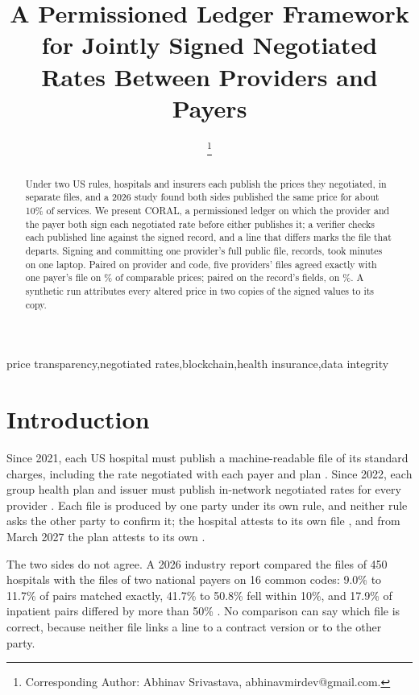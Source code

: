 \documentclass{IOS-Book-Article}
\def\hb{\hbox to 11.5 cm{}}
\begin{document}
\pagestyle{headings}
\def\thepage{}
\begin{frontmatter}
\title{A Permissioned Ledger Framework for Jointly Signed Negotiated Rates Between Providers and Payers}
\markboth{}{\hb}
\author[A]{ %
\thanks{Corresponding Author: Abhinav Srivastava, abhinavmirdev@gmail.com.}}
\address[A]{Independent Researcher}

\begin{abstract}
Under two US rules, hospitals and insurers each publish the prices they negotiated, in separate files, and a 2026 study found both sides published the same price for about 10\% of services. We present CORAL, a permissioned ledger on which the provider and the payer both sign each negotiated rate before either publishes it; a verifier checks each published line against the signed record, and a line that differs marks the file that departs. Signing and committing one provider's full public file, \sheetRecords{} records, took \sheetTotalMin{} minutes on one laptop. Paired on provider and code, five providers' files agreed exactly with one payer's file on \coarseExact\% of comparable prices; paired on the record's fields, on \pairLineExact\%. A synthetic run attributes every altered price in two copies of the signed values to its copy.
\end{abstract}

\begin{keyword}
price transparency\sep negotiated rates\sep blockchain\sep health insurance\sep data integrity
\end{keyword}
\end{frontmatter}
\markboth{\hb}{\hb}

\section{Introduction}

Since 2021, each US hospital must publish a machine-readable file of its standard charges, including the rate negotiated with each payer and plan \cite{hpt}. Since 2022, each group health plan and issuer must publish in-network negotiated rates for every provider \cite{tic}. Each file is produced by one party under its own rule, and neither rule asks the other party to confirm it; the hospital attests to its own file \cite{opps2026}, and from March 2027 the plan attests to its own \cite{tic2026}.

The two sides do not agree. A 2026 industry report compared the files of 450 hospitals with the files of two national payers on 16 common codes: 9.0\% to 11.7\% of pairs matched exactly, 41.7\% to 50.8\% fell within 10\%, and 17.9\% of inpatient pairs differed by more than 50\% \cite{trilliant}. No comparison can say which file is correct, because neither file links a line to a contract version or to the other party.
\end{document}
